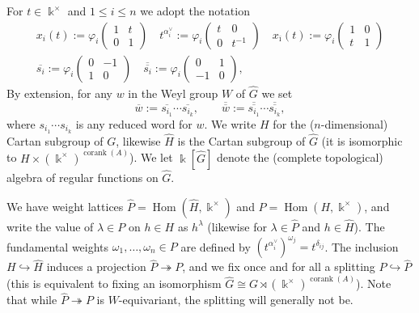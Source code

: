 \documentclass[12pt]{amsart}
\newcommand{\sayDR}[1]{\say[DR]{\color{red}{\bf DR:}\;#1}}
\newcommand{\kk}{\Bbbk}
\newcommand\onto{\twoheadrightarrow}
\newcommand\into{\hookrightarrow}
\DeclareMathOperator{\Hom}{Hom}
\DeclareMathOperator{\corank}{corank}
\newcommand{\ol}[1]{\overline{#1}}
\newcommand{\dol}[1]{\overline{\overline{#1}}}
\theoremstyle{remark}
\numberwithin{equation}{section}
\numberwithin{figure}{section}
\begin{document}
For $t \in \kk^\times$ and $1 \leq i \leq n$ we adopt the notation
\begin{gather}
  x_{i}(t):=\varphi_i\begin{pmatrix} 1 & t \\ 0 & 1\end{pmatrix}
  \quad
  t^{\alpha_i^\vee}:=\varphi_i\begin{pmatrix}t & 0 \\ 0 & t^{-1}\end{pmatrix}
  \quad
  x_{\ol{\imath}}(t):=\varphi_i\begin{pmatrix} 1 & 0 \\ t & 1\end{pmatrix}
  \\
  \ol{s_{i}} := \varphi_i \begin{pmatrix} 0 & -1 \\ 1 & 0 \end{pmatrix}
  \quad
  \dol{s_{i}} := \varphi_i \begin{pmatrix} 0 & 1 \\ -1 & 0 \end{pmatrix},
\end{gather}
By extension, for any $w$ in the Weyl group $W$ of $\widehat{G}$ we set \[\ol{w} := \ol{s_{i_1}}\cdots\ol{s_{i_k}}, \quad \quad \dol{w} := \dol{s_{i_1}}\cdots\dol{s_{i_k}},\] where $s_{i_1}\cdots s_{i_k}$ is any reduced word for $w$.
We write $H$ for the ($n$-dimensional) Cartan subgroup of $G$, likewise $\widehat{H}$ is the Cartan subgroup of $\widehat{G}$ (it is isomorphic to $H \times (\kk^\times)^{\corank(A)}$).
We let $\kk[\widehat{G}]$ denote the (complete %
topological) algebra of regular functions on $\widehat{G}$.

We have weight lattices $\widehat{P} = \Hom(\widehat{H},\kk^\times)$ and $P = \Hom(H,\kk^\times)$, and write the value of $\lambda \in P$ on $h \in H$ as $h^\lambda$ (likewise for $\lambda \in \widehat{P}$ and $h \in \widehat{H}$).
The fundamental weights $\omega_1,\dotsc,\omega_n \in P$ are defined by $(t^{\alpha_i^\vee})^{\omega_j} = t^{\delta_{ij}}$.
The inclusion $H \into \widehat{H}$ induces a projection $\widehat{P} \onto P$, and we fix once and for all a splitting $P \into \widehat{P}$ (this is equivalent to fixing an isomorphism $\widehat{G} \cong G \rtimes (\kk^\times)^{\corank(A)}$).
Note that while $\widehat{P} \onto P$ is $W$-equivariant, the splitting will generally not be.
\end{document}
